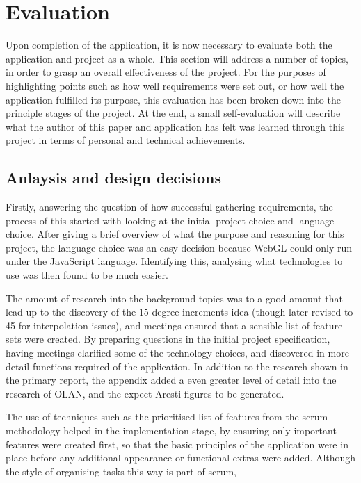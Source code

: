 \chapter{Evaluation}
Upon completion of the application, it is now necessary to evaluate both the application and project as a whole. This section will address a number of topics, in order to grasp an overall effectiveness of the project. For the purposes of highlighting points such as how well requirements were set out, or how well the application fulfilled its purpose, this evaluation has been broken down into the principle stages of the project. At the end, a small self-evaluation will describe what the author of this paper and application has felt was learned through this project in terms of personal and technical achievements.

\section{Anlaysis and design decisions}
Firstly, answering the question of how successful gathering requirements, the process of this started with looking at the initial project choice and language choice. After giving a brief overview of what the purpose and reasoning for this project, the language choice was an easy decision because WebGL could only run under the JavaScript language. Identifying this, analysing what technologies to use was then found to be much easier. 

The amount of research into the background topics was to a good amount that lead up to the discovery of the 15 degree increments idea (though later revised to 45 for interpolation issues), and meetings ensured that a sensible list of feature sets were created. By preparing questions in the initial project specification, having meetings clarified some of the technology choices, and discovered in more detail functions required of the application. In addition to the research shown in the primary report, the appendix added a even greater level of detail into the research of OLAN, and the expect Aresti figures to be generated.

The use of techniques such as the prioritised list of features from the scrum methodology helped in the implementation stage, by ensuring only important features were created first, so that the basic principles of the application were in place before any additional appearance or functional extras were added. Although the style of organising tasks this way is part of scrum, 

